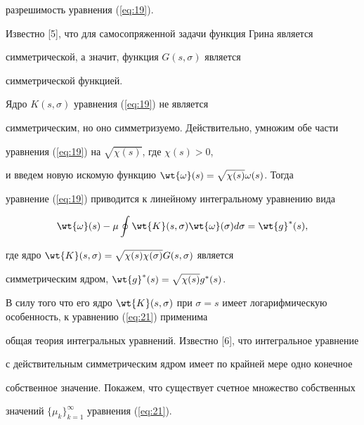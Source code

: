разрешимость уравнения (\ref{eq:19}).





Известно [5], что для самосопряженной задачи функция Грина является 


симметрической, а значит, функция $G ({s,\sigma })$ является 


симметрической функцией.





Ядро $K ({s,\sigma })$ уравнения (\ref{eq:19}) не является 


симметрическим, но оно симметризуемо. Действительно, умножим обе части 


уравнения (\ref{eq:19}) на $\sqrt {\chi (s)}$, где $\chi (s) > 0$,


и введем новую искомую функцию $\wt {\omega } (s) =


\sqrt {\chi (s)} \omega (s)$. Тогда 


уравнение (\ref{eq:19}) приводится к линейному интегральному уравнению вида


\begin{equation}\label{eq:21}


\wt {\omega } (s) - \mu \oint{\wt {K} ({s,\sigma })\wt {\omega }


(\sigma)d\sigma=\wt {g}^\ast (s)}, 


\end{equation}


где ядро $\wt {K} ({s,\sigma })=\sqrt {\chi (s )\chi (\sigma)}


G ({s,\sigma })$ является 


симметрическим ядром, $\wt {g}^\ast (s)=\sqrt {\chi (s)} g^\ast (s)$.





В силу того что его ядро $\wt {K} ({s,\sigma })$ при $\sigma 


= s$ имеет логарифмическую особенность, к уравнению (\ref{eq:21}) применима


общая теория интегральных уравнений. Известно [6], что интегральное уравнение


с действительным симметрическим ядром имеет по крайней мере одно конечное 


собственное значение. Покажем, что существует счетное множество собственных 


значений $ \{ {\mu _k } \}_{k=1}^\infty$ уравнения (\ref{eq:21}).






